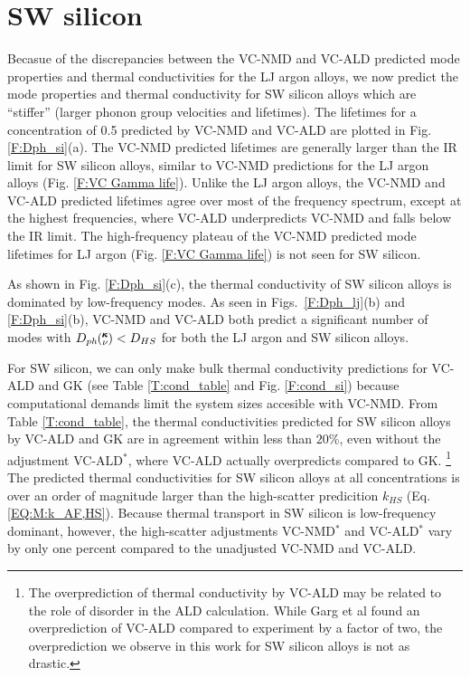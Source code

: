 \documentclass[aps,prb,onecolumn,preprint,superscriptaddress,amsmath,amssymb,floatfix]{revtex4}
\newcommand{\kv}{\mspace{-4.0mu}\left(\mspace{-8.0mu}
\begin{smallmatrix}&\pmb{\kappa} \\&\nu\end{smallmatrix}
\mspace{-3.0mu}\right)}
\begin{document}
\clearpage

\section{\label{S:SW}SW silicon}

Becasue of the discrepancies between the VC-NMD and VC-ALD predicted 
mode properties and thermal conductivities for the LJ argon alloys, 
we now predict the mode properties and thermal conductivity for 
SW silicon alloys which are ``stiffer'' (larger phonon group velocities 
and lifetimes). The lifetimes for a concentration of 0.5 predicted 
by VC-NMD and VC-ALD are plotted in Fig. \ref{F:Dph_si}(a). 
The VC-NMD predicted lifetimes are generally larger than 
the IR limit for SW silicon alloys, similar 
to VC-NMD predictions for the LJ argon alloys 
(Fig. \ref{F:VC Gamma life}). Unlike the 
LJ argon alloys, the  
VC-NMD and VC-ALD predicted lifetimes agree over most 
of the frequency spectrum, except at the highest frequencies, where 
VC-ALD underpredicts VC-NMD and falls below the IR limit. 
The high-frequency plateau of the VC-NMD predicted mode lifetimes 
for LJ argon (Fig. \ref{F:VC Gamma life}) is not seen for SW silicon.

As shown in Fig. \ref{F:Dph_si}(c), the thermal conductivity of 
SW silicon alloys is dominated by 
low-frequency modes. As seen in Figs.~\ref{F:Dph_lj}(b) 
and \ref{F:Dph_si}(b), 
VC-NMD and VC-ALD both predict a significant 
number of modes with  
$D_{ph}\kv < D_{HS}$ for both the LJ argon and SW silicon alloys.  

For SW silicon, we can only make bulk thermal conductivity 
predictions for VC-ALD and GK (see Table \ref{T:cond_table} and 
Fig. \ref{F:cond_si}) 
because computational demands  
limit the system sizes accesible with VC-NMD. 
From Table \ref{T:cond_table}, the thermal conductivities predicted 
for SW silicon alloys by VC-ALD and GK 
are in agreement within less than $20\%$, 
even without the adjustment VC-ALD$^*$, where  
VC-ALD actually overpredicts compared to GK. 
\footnote[6]
{The overprediction of thermal conductivity by VC-ALD 
may be related to the role of disorder in the ALD calculation.
\cite{garg_role_2011,turney_predicting_2009} While Garg et al found 
an overprediction of VC-ALD compared to experiment by a factor of two, 
the overprediction 
we observe in this work for SW silicon alloys is not as drastic.} 
The predicted thermal conductivities for SW silicon alloys at 
all concentrations is over an order of magnitude larger than
the high-scatter predicition $k_{HS}$ 
(Eq. \eqref{EQ:M:k_AF,HS}). 
Because thermal transport in SW silicon is low-frequency dominant, 
however, 
the high-scatter adjustments VC-NMD$^*$ and VC-ALD$^*$ vary by only 
one percent compared to the unadjusted VC-NMD and VC-ALD.
\end{document}
